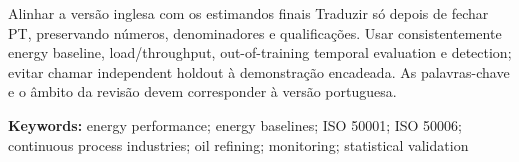 
{Alinhar a versão inglesa com os estimandos finais}
{Traduzir só depois de fechar PT, preservando números, denominadores e
qualificações. Usar consistentemente energy baseline, load/throughput,
out-of-training temporal evaluation e detection; evitar chamar
independent holdout à demonstração encadeada. As palavras-chave e o
âmbito da revisão devem corresponder à versão portuguesa.}%

\bigskip
\noindent\textbf{Keywords:} energy performance; energy baselines; ISO 50001; ISO 50006; continuous process industries; oil refining; monitoring; statistical validation
